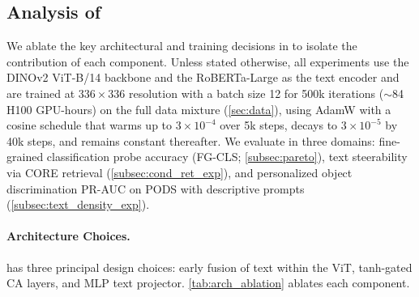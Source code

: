 
\subsection{Analysis of \model{}}
\label{sec:ablations}



We ablate the key architectural and training decisions in \model{} to isolate the contribution of each component.
Unless stated otherwise, all experiments use the DINOv2 ViT-B/14 backbone and the RoBERTa-Large as the text encoder and are trained at $336{\times}336$ resolution with a batch size 12 for 500k iterations (${\sim}$84 H100 GPU-hours) on the full data mixture (\cref{sec:data}), using AdamW with a cosine schedule that warms up to $3{\times}10^{-4}$ over 5k steps, decays to $3{\times}10^{-5}$ by 40k steps, and remains constant thereafter.
We evaluate in three domains: fine-grained classification probe accuracy (FG-CLS; \cref{subsec:pareto}), text steerability via CORE retrieval (\cref{subsec:cond_ret_exp}), and personalized object discrimination PR-AUC on PODS with descriptive prompts (\cref{subsec:text_density_exp}). %


\paragraph{Architecture Choices.}
\label{subsec:arch_ablation}


\model{} has three principal design choices:
early fusion of text within the ViT,
tanh-gated CA layers, and
MLP text projector.
\cref{tab:arch_ablation} ablates each component.



